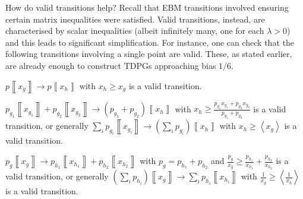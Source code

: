 \documentclass{article}
\begin{document}
How do valid transitions help? Recall that EBM transitions involved ensuring certain matrix inequalities were satisfied. Valid transitions, instead, are characterised by scalar inequalities (albeit infinitely many, one for each $\lambda>0$) and this leads to significant simplification. For instance, one can check that the following transitions involving a single point are valid. These, as stated earlier, are already enough to construct TDPGs approaching bias $1/6$.

\begin{example}
  $p\left\llbracket x_{g}\right\rrbracket \to p\left\llbracket x_{h}\right\rrbracket $
  with $x_{h}\ge x_{g}$ is a valid transition.\label{exa:pointRaise}


\end{example}

\begin{example}
  \label{exa:merge} $p_{g_{1}}\left\llbracket x_{g_{1}}\right\rrbracket +p_{g_{2}}\left\llbracket x_{g_{2}}\right\rrbracket \to(p_{g_{1}}+p_{g_{2}})\left\llbracket x_{h}\right\rrbracket $
  with $x_{h}\ge\frac{p_{g_{1}}x_{g_{1}}+p_{g_{2}}x_{g_{2}}}{p_{g_{1}}+p_{g_{2}}}$
  is a valid transition, or generally $\sum_{i}p_{g_{i}}\left\llbracket x_{g_{i}}\right\rrbracket \to(\sum_{i}p_{g_{i}})\left\llbracket x_{h}\right\rrbracket $
  with $x_{h}\ge\left\langle x_{g}\right\rangle $ is a valid transition.
\end{example}

\begin{example}
  $p_{g}\left\llbracket x_{g}\right\rrbracket \to p_{h_{1}}\left\llbracket x_{h_{1}}\right\rrbracket +p_{h_{2}}\left\llbracket x_{h_{2}}\right\rrbracket $
  with $p_{g}=p_{h_{1}}+p_{h_{2}}$ and $\frac{p_{g}}{x_{g}}\ge\frac{p_{h_{1}}}{x_{h_{1}}}+\frac{p_{h_{2}}}{x_{h_{2}}}$
  is a valid transition, or generally $\left(\sum_{i}p_{h_{i}}\right)\left\llbracket x_{g}\right\rrbracket \to\sum_{i}p_{h_{i}}\left\llbracket x_{h_{i}}\right\rrbracket $
  with $\frac{1}{x_{g}}\ge\left\langle \frac{1}{x_{h}}\right\rangle $
  is a valid transition.\label{exa:split}
\end{example}
\end{document}
